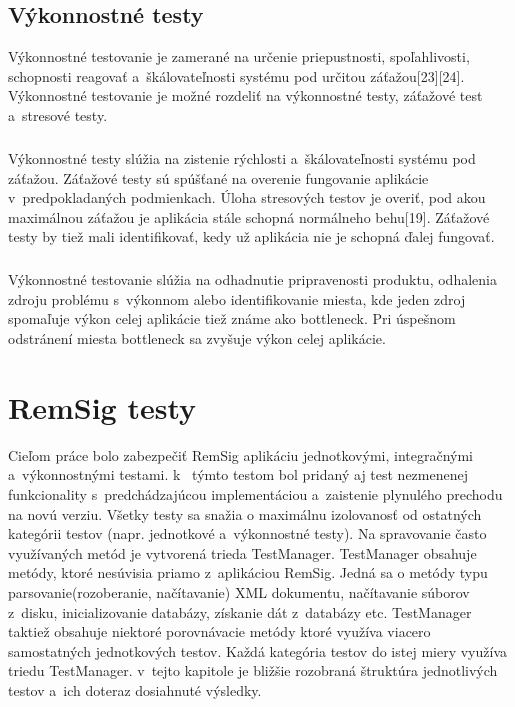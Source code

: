 \documentclass[
  printed, %
  notable,   %
  nolof,     %
    oneside,       %
  nolot,     %
]{fithesis3}
\begin{document}
\section{Výkonnostné testy}
Výkonnostné testovanie je zamerané na určenie priepustnosti, spoľahlivosti, schopnosti reagovať a~škálovateľnosti systému pod určitou záťažou[23][24]. Výkonnostné testovanie je možné rozdeliť na výkonnostné testy, záťažové test a~stresové testy.\paragraph{}
Výkonnostné testy slúžia na zistenie rýchlosti a~škálovateľnosti systému pod záťažou. Záťažové testy sú spúšťané na overenie fungovanie aplikácie v~predpokladaných podmienkach. Úloha stresových  testov je overiť, pod akou maximálnou záťažou je aplikácia stále schopná normálneho behu[19]. Záťažové testy by tiež mali identifikovať, kedy už aplikácia nie je schopná ďalej fungovať.\paragraph{}
Výkonnostné testovanie slúžia na odhadnutie pripravenosti produktu, odhalenia zdroju problému s~výkonnom alebo  identifikovanie miesta, kde jeden zdroj spomaľuje výkon celej aplikácie tiež známe ako bottleneck. Pri úspešnom odstránení miesta bottleneck sa zvyšuje výkon celej aplikácie. 




\chapter{RemSig testy}
Cieľom práce bolo zabezpečiť  RemSig aplikáciu jednotkovými, integračnými a~výkonnostnými testami. k~ týmto testom bol pridaný aj test nezmenenej funkcionality s~predchádzajúcou implementáciou a~zaistenie plynulého prechodu na novú verziu. Všetky  testy sa snažia o maximálnu izolovanosť od ostatných kategórii  testov (napr. jednotkové a~výkonnostné testy). Na spravovanie často využívaných metód je vytvorená trieda TestManager. TestManager obsahuje metódy, ktoré nesúvisia priamo z~aplikáciou RemSig. Jedná sa o metódy typu parsovanie(rozoberanie, načítavanie) XML dokumentu, načítavanie súborov z~disku, inicializovanie databázy, získanie dát z~databázy etc. TestManager taktiež obsahuje niektoré porovnávacie metódy ktoré využíva viacero samostatných jednotkových testov. Každá kategória testov do istej miery využíva triedu TestManager. v~tejto kapitole je bližšie rozobraná štruktúra jednotlivých testov a~ich doteraz dosiahnuté výsledky.
\end{document}

